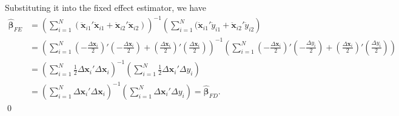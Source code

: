 \documentclass[10pt]{article}
\begin{document}
\begin{enumerate}
Substituting it into the fixed effect estimator, we have
\begin{align*}
    \hat{\pmb{\beta}}_{FE}&=\left(\sum_{i=1}^N(\ddot{\textbf{x}}_{i1}'\ddot{\textbf{x}}_{i1}+\ddot{\textbf{x}}_{i2}'\ddot{\textbf{x}}_{i2})\right)^{-1}\left(\sum_{i=1}^N(\ddot{\textbf{x}}_{i1}'\ddot{y}_{i1}+\ddot{\textbf{x}}_{i2}'\ddot{y}_{i2}\right)\\
    &=\left(\sum_{i=1}^N\left(-\frac{\Delta\textbf{x}_i}{2}\right)'\left(-\frac{\Delta\textbf{x}_i}{2}\right)+\left(\frac{\Delta\textbf{x}_i}{2}\right)'\left(\frac{\Delta\textbf{x}_i}{2}\right)\right)^{-1}
    \left(\sum_{i=1}^N\left(-\frac{\Delta\textbf{x}_i}{2}\right)'\left(-\frac{\Delta{y}_i}{2}\right)+\left(\frac{\Delta\textbf{x}_i}{2}\right)'\left(\frac{\Delta{y}_i}{2}\right)\right)\\
    &=\left(\sum_{i=1}^N\frac{1}{2}\Delta\textbf{x}_i'\Delta\textbf{x}_i\right)^{-1}
    \left(\sum_{i=1}^N\frac{1}{2}\Delta\textbf{x}_i'\Delta{y}_i\right)\\
    &=\left(\sum_{i=1}^N\Delta\textbf{x}_i'\Delta\textbf{x}_i\right)^{-1}
    \left(\sum_{i=1}^N\Delta\textbf{x}_i'\Delta{y}_i\right)=\hat{\pmb{\beta}}_{FD}.
\end{align*}\qed


\end{enumerate}
\end{document}
